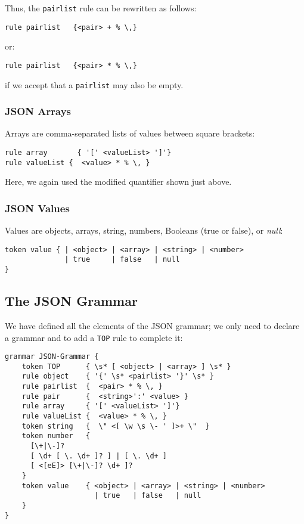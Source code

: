 Thus, the {\tt pairlist} rule can be rewritten as follows:

\begin{verbatim}
rule pairlist   {<pair> + % \,}
\end{verbatim}

or:

\begin{verbatim}
rule pairlist   {<pair> * % \,}
\end{verbatim}

if we accept that a {\tt pairlist} may also be empty.

\subsubsection{JSON Arrays}

Arrays are comma-separated lists of values between square 
brackets:

\begin{verbatim}
rule array       { '[' <valueList> ']'}
rule valueList {  <value> * % \, }
\end{verbatim}

Here, we again used the modified quantifier shown 
just above.

\subsubsection{JSON Values}

Values are objects, arrays, string, numbers, Booleans 
(true or false), or \emph{null}:

\begin{verbatim}
token value { | <object> | <array> | <string> | <number> 
              | true     | false   | null 
}
\end{verbatim}

\subsection{The JSON Grammar}

We have defined all the elements of the JSON grammar; we 
only need to declare a grammar and to add a {\tt TOP} rule 
to complete it:

\begin{verbatim}
grammar JSON-Grammar {
    token TOP      { \s* [ <object> | <array> ] \s* }
    rule object    { '{' \s* <pairlist> '}' \s* }
    rule pairlist  {  <pair> * % \, }
    rule pair      {  <string>':' <value> }
    rule array     { '[' <valueList> ']'}
    rule valueList {  <value> * % \, }
    token string   {  \" <[ \w \s \- ' ]>+ \"  }
    token number   { 
      [\+|\-]?  
      [ \d+ [ \. \d+ ]? ] | [ \. \d+ ]  
      [ <[eE]> [\+|\-]? \d+ ]?
    }
    token value    { <object> | <array> | <string> | <number> 
                     | true   | false   | null 
    }
}
\end{verbatim}

